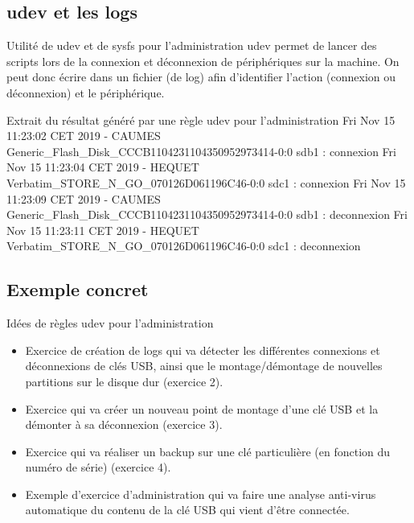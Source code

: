 \documentclass{beamer}
\begin{document}
\subsection{udev et les logs}
\begin{frame}
\begin{block}{Utilité de udev et de sysfs pour l'administration} 
	udev permet de lancer des scripts lors de la connexion et déconnexion de périphériques sur la machine. \newline On peut donc écrire dans un fichier (de log) afin d'identifier l'action (connexion ou déconnexion) et le périphérique. 
\end{block}


\begin{exampleblock}{Extrait du résultat généré par une règle udev pour l'administration}
	\tiny{
		Fri Nov 15 11:23:02 CET 2019 - CAUMES Generic\_Flash\_Disk\_CCCB1104231104350952973414-0:0 sdb1 : connexion \newline
		Fri Nov 15 11:23:04 CET 2019 - HEQUET Verbatim\_STORE\_N\_GO\_070126D061196C46-0:0 sdc1 : connexion \newline
		Fri Nov 15 11:23:09 CET 2019 - CAUMES Generic\_Flash\_Disk\_CCCB1104231104350952973414-0:0 sdb1 : deconnexion \newline
		Fri Nov 15 11:23:11 CET 2019 - HEQUET Verbatim\_STORE\_N\_GO\_070126D061196C46-0:0 sdc1 : deconnexion \newline
	}
\end{exampleblock}
\end{frame}

\subsection{Exemple concret}
\begin{frame}
\begin{exampleblock}{Idées de règles udev pour l'administration}
	\begin{itemize}
		[circle]
		\item Exercice de création de logs qui va détecter les différentes connexions et déconnexions de clés USB, ainsi que le montage/démontage
		de nouvelles partitions sur le disque dur (exercice 2).
	    \item Exercice qui va créer un nouveau point de montage d'une clé USB et la démonter à sa déconnexion (exercice 3).
		\item Exercice qui va réaliser un backup sur une clé particulière (en fonction du numéro de série) (exercice 4).
		\item Exemple d'exercice d'administration qui va faire une analyse anti-virus automatique du contenu de la clé USB qui vient d'être connectée.
		
	\end{itemize}
\end{exampleblock}
\end{frame}
\end{document}
